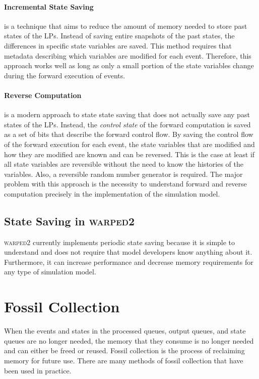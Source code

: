 \documentclass[11pt]{book}
\begin{document}
\paragraph{Incremental State Saving} is a technique that aims to reduce the amount of
memory needed to store past states of the LPs. Instead of saving entire snapshots of the
past states, the differences in specific state variables are saved. This method requires
that metadata describing which variables are modified for each event. Therefore, this approach
works well as long as only a small portion of the state variables change during the forward
execution of events.

\paragraph{Reverse Computation} is a modern approach to state state saving that does not
actually save any past states of the LPs. Instead, the \emph{control state} of the forward
computation is saved as a set of bits that describe the forward control flow. By saving the control
flow of the forward execution for each event, the state variables that are modified and
how they are modified are known and can be reversed. This is the case at least if all state variables
are reversible without the need to know the histories of the variables. Also, a reversible
random number generator is required. The major problem with this approach is the necessity to
understand forward and reverse computation precisely in the implementation of the simulation model.

\subsection{State Saving in \textsc{warped2}}

\textsc{warped2} currently implements periodic state saving because it is simple to understand
and does not require that model developers know anything about it. Furthermore, it can increase
performance and decrease memory requirements for any type of simulation model. 

\section{Fossil Collection}

When the events and states in the processed queues, output queues, and state queues are
no longer needed, the memory that they consume is no longer needed and can either be freed
or reused. Fossil collection is the process of reclaiming memory for future use. There
are many methods of fossil collection that have been used in practice.
\end{document}
